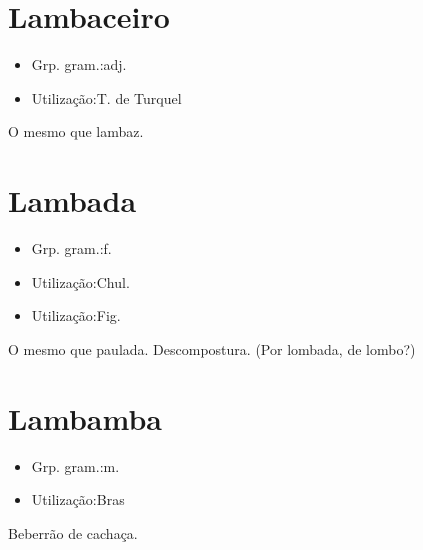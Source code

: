 \section{Lambaceiro}
\begin{itemize}
\item {Grp. gram.:adj.}
\end{itemize}
\begin{itemize}
\item {Utilização:T. de Turquel}
\end{itemize}
O mesmo que \textunderscore lambaz\textunderscore .
\section{Lambada}
\begin{itemize}
\item {Grp. gram.:f.}
\end{itemize}
\begin{itemize}
\item {Utilização:Chul.}
\end{itemize}
\begin{itemize}
\item {Utilização:Fig.}
\end{itemize}
O mesmo que \textunderscore paulada\textunderscore .
Descompostura.
(Por \textunderscore lombada\textunderscore , de \textunderscore lombo\textunderscore ?)
\section{Lambamba}
\begin{itemize}
\item {Grp. gram.:m.}
\end{itemize}
\begin{itemize}
\item {Utilização:Bras}
\end{itemize}
Beberrão de cachaça.
